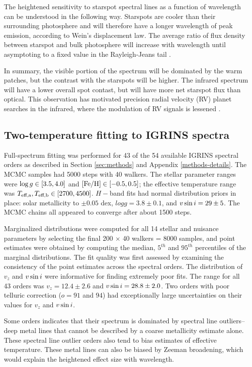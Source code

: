 \documentclass[twocolumn]{emulateapj}%
\begin{document}
The heightened sensitivity to starspot spectral lines as a function of wavelength can be understood in the following way.  Starspots are cooler than their surrounding photosphere and will therefore have a longer wavelength of peak emission, according to Wein's displacement law.  The average ratio of flux density between starspot and bulk photosphere will increase with wavelength until asymptoting to a fixed value in the Rayleigh-Jeans tail \citep{wolk96}.

In summary, the visible portion of the spectrum will be dominated by the warm patches, but the contrast with the starspots will be higher.  The infrared spectrum will have a lower overall spot contast, but will have more net starspot flux than optical.  This observation has motivated precision radial velocity (RV) planet searches in the infrared, where the modulation of RV signals is lessened \citep{prato08}.


\subsection{Two-temperature fitting to IGRINS spectra}\label{sec:two_tempIGRINS}

Full-spectrum fitting was performed for 43 of the 54 available IGRINS spectral orders as described in Section \ref{sec:methods} and Appendix \ref{methods-details}.  The MCMC samples had 5000 steps with 40 walkers.  The stellar parameter ranges were $\log g \in [3.5, 4.0]$ and $[{\rm Fe}/{\rm H}] \in [-0.5, 0.5]$; the effective temperature range was $T_\textrm{eff,a}, T_\textrm{eff,b} \in [2700, 4500]$.  $H-$band fits had normal distribution priors in place: solar metallicity to $\pm0.05$ dex, $logg=3.8\pm0.1$, and $v \sin i=29\pm5$.  The MCMC chains all appeared to converge after about 1500 steps.

Marginalized distributions were computed for all 14 stellar and nuisance parameters by selecting the final 200 $\times$ 40 walkers = 8000 samples, and point estimates were obtained by computing the median, $5^{th}$ and $95^{th}$ percentiles of the marginal distributions.  The fit quality was first assessed by examining the consistency of the point estimates across the spectral orders.  The distribution of $v_z$ and $v \sin i$ were informative for finding extremely poor fits.  The range for all 43 orders was $v_z = 12.4 \pm 2.6$ and $v \sin i = 28.8 \pm 2.0$.  Two orders with poor telluric correction ($o=91$ and $94$) had exceptionally large uncertainties on their values for $v_z$ and $v \sin i$.

Some orders indicates that their spectrum is dominated by spectral line outliers--deep metal lines that cannot be described by a coarse metallicity estimate alone.  These spectral line outlier orders also tend to bias estimates of effective temperature.  These metal lines can also be biased by Zeeman broadening, which would explain the heightened effect size with wavelength.
\end{document}
